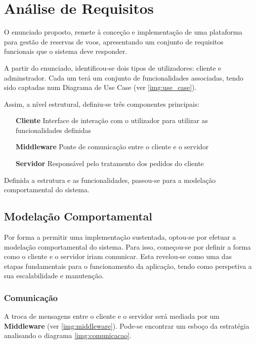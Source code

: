 \documentclass[a4paper,11pt]{scrreprt}
\begin{document}

\chapter{Análise de Requisitos} \label{chap:analise_requisitos}

O enunciado proposto, remete à conceção e implementação de uma plataforma para gestão de reservas 
de voos, apresentando um conjunto de requisitos funcionais que o sistema deve responder.

A partir do enunciado, identificou-se dois tipos de utilizadores: cliente e adminstrador.
Cada um terá um conjunto de funcionalidades associadas,
tendo sido captadas num Diagrama de Use Case (ver \ref{img:use_case}).

Assim, a nível estrutural, definiu-se três componentes principais:
\begin{itemize}
    \item[\textbf{Cliente}] Interface de interação com o utilizador para utilizar as funcionalidades definidas
    \item[\textbf{Middleware}] Ponte de comunicação entre o cliente e o servidor
    \item[\textbf{Servidor}] Responsável pelo tratamento dos pedidos do cliente
\end{itemize}

Definida a estrutura e as funcionalidades, passou-se para a modelação comportamental do sistema.

\section{Modelação Comportamental} \label{strat_esc}

Por forma a permitir uma implementação sustentada, optou-se por efetuar a modelação comportamental 
do sistema.
Para isso, começou-se por definir a forma como o cliente e o servidor iriam comunicar.
Esta revelou-se como uma das etapas fundamentais para o funcionamento da aplicação,
tendo como perspetiva a sua escalabilidade e manutenção.

\subsection{Comunicação}

A troca de mensagens entre o cliente e o servidor será mediada por um \textbf{Middleware} (ver \ref{img:middleware}).
Pode-se encontrar um esboço da estratégia analisando o diagrama \ref{img:comunicacao}.
\end{document}
